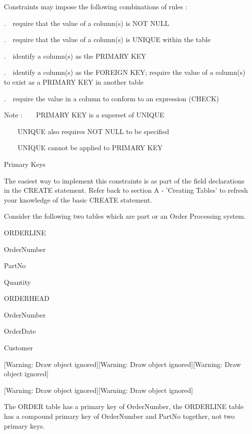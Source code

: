 Constraints may impose the following combinations of rules :

.\ \ require that the value of a column(s) is NOT NULL

.\ \ require that the value of a column(s) is UNIQUE within the table

.\ \ identify a column(s) as the PRIMARY KEY

.\ \ identify a column(s) as the FOREIGN KEY; require the value of a column(s) to exist as a PRIMARY KEY in another table 

.\ \ require the value in a column to conform to an expression (CHECK)

Note :\ \ \ \ PRIMARY KEY is a superset of UNIQUE 

\ \ \ \ UNIQUE also requires NOT NULL to be specified

\ \ \ \ UNIQUE cannot be applied to PRIMARY KEY

Primary Keys

The easiest way to implement this constraints is as part of the field declarations in the CREATE statement.  Refer back to section A - 'Creating Tables' to refresh your knowledge of the basic CREATE statement.

Consider the following two tables which are part or an Order Processing system.



\begin{center}
\begin{minipage}{3.387cm}
ORDERLINE

OrderNumber

PartNo

Quantity
\end{minipage}
\end{center}
\begin{center}
\begin{minipage}{3.387cm}
ORDERHEAD

OrderNumber

OrderDate

Customer
\end{minipage}
\end{center}
[Warning: Draw object ignored][Warning: Draw object ignored][Warning: Draw object ignored]

[Warning: Draw object ignored][Warning: Draw object ignored]

The ORDER table has a primary key of OrderNumber, the ORDERLINE table has a compound primary key of OrderNumber and PartNo together, not two primary keys.

